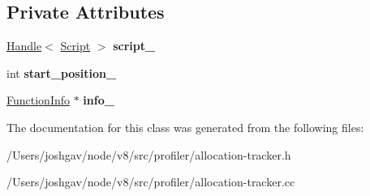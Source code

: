 \subsection*{Private Attributes}
\begin{DoxyCompactItemize}
\item 
\hyperlink{classv8_1_1internal_1_1_handle}{Handle}$<$ \hyperlink{classv8_1_1internal_1_1_script}{Script} $>$ {\bfseries script\+\_\+}\hypertarget{classv8_1_1internal_1_1_allocation_tracker_1_1_unresolved_location_ac181114fafa3d981580f1d328a43311f}{}\label{classv8_1_1internal_1_1_allocation_tracker_1_1_unresolved_location_ac181114fafa3d981580f1d328a43311f}

\item 
int {\bfseries start\+\_\+position\+\_\+}\hypertarget{classv8_1_1internal_1_1_allocation_tracker_1_1_unresolved_location_accc5ab48bbc1ca6ea6cee3d3f1b71b28}{}\label{classv8_1_1internal_1_1_allocation_tracker_1_1_unresolved_location_accc5ab48bbc1ca6ea6cee3d3f1b71b28}

\item 
\hyperlink{structv8_1_1internal_1_1_allocation_tracker_1_1_function_info}{Function\+Info} $\ast$ {\bfseries info\+\_\+}\hypertarget{classv8_1_1internal_1_1_allocation_tracker_1_1_unresolved_location_abab7ba264c4225603fbc5704d14696f5}{}\label{classv8_1_1internal_1_1_allocation_tracker_1_1_unresolved_location_abab7ba264c4225603fbc5704d14696f5}

\end{DoxyCompactItemize}


The documentation for this class was generated from the following files\+:\begin{DoxyCompactItemize}
\item 
/\+Users/joshgav/node/v8/src/profiler/allocation-\/tracker.\+h\item 
/\+Users/joshgav/node/v8/src/profiler/allocation-\/tracker.\+cc\end{DoxyCompactItemize}
